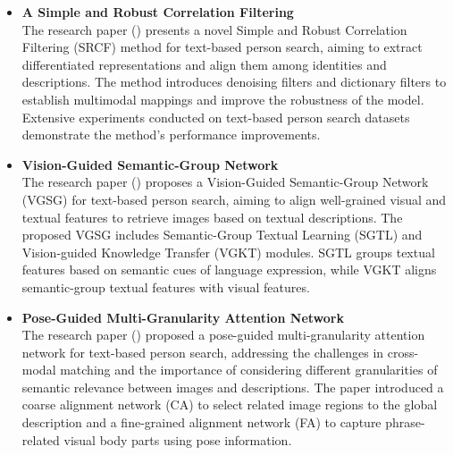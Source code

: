 \begin{itemize}
    \item \textbf{A Simple and Robust Correlation Filtering}\\
    The research paper (\cite{Suo_ECCV_A}) presents a novel Simple and Robust Correlation Filtering (SRCF) method for text-based person search, aiming to extract differentiated representations and align them among identities and descriptions. The method introduces denoising filters and dictionary filters to establish multimodal mappings and improve the robustness of the model. Extensive experiments conducted on text-based person search datasets demonstrate the method's performance improvements. 
    
    \item \textbf{Vision-Guided Semantic-Group Network} \\
    The research paper (\cite{he2023vgsg}) proposes a Vision-Guided Semantic-Group Network (VGSG) for text-based person search, aiming to align well-grained visual and textual features to retrieve images based on textual descriptions. The proposed VGSG includes Semantic-Group Textual Learning (SGTL) and Vision-guided Knowledge Transfer (VGKT) modules. SGTL groups textual features based on semantic cues of language expression, while VGKT aligns semantic-group textual features with visual features. 
    
    \item \textbf{Pose-Guided Multi-Granularity Attention Network}\\
    The research paper (\cite{jing2019poseguided}) proposed a pose-guided multi-granularity attention network for text-based person search, addressing the challenges in cross-modal matching and the importance of considering different granularities of semantic relevance between images and descriptions. The paper introduced a coarse alignment network (CA) to select related image regions to the global description and a fine-grained alignment network (FA) to capture phrase-related visual body parts using pose information. 
    
\end{itemize}
